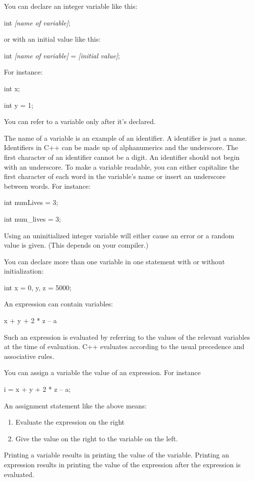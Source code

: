 \documentclass[
]{article}
\providecommand{\tightlist}{%
  \setlength{\itemsep}{0pt}\setlength{\parskip}{0pt}}
\begin{document}
You can declare an integer variable like this:

int\emph{ {[}name of variable{]}};

or with an initial value like this:

int\emph{ {[}name of variable{]}} = \emph{{[}initial value{]}};

For instance:

int x;

int y = 1;

You can refer to a variable only after it's declared.

The name of a variable is an example of an identifier. A identifier is
just a name. Identifiers in C++ can be made up of alphanumerics and the
underscore. The first character of an identifier cannot be a digit. An
identifier should not begin with an underscore. To make a variable
readable, you can either capitalize the first character of each word in
the variable's name or insert an underscore between words. For instance:

int numLives = 3;

int num\_lives = 3;

Using an uninitialized integer variable will either cause an error or a
random value is given. (This depends on your compiler.)

You can declare more than one variable in one statement with or without
initialization:

int x = 0, y, z = 5000;

An expression can contain variables:

x + y + 2 * z -- a

Such an expression is evaluated by referring to the values of the
relevant variables at the time of evaluation. C++ evaluates according to
the usual precedence and associative rules.

You can assign a variable the value of an expression. For instance

i = x + y + 2 * z -- a;

An assignment statement like the above means:

\begin{enumerate}
\def\labelenumi{\arabic{enumi}.}
\tightlist
\item
  Evaluate the expression on the right
\item
  Give the value on the right to the variable on the left.
\end{enumerate}

Printing a variable results in printing the value of the variable.
Printing an expression results in printing the value of the expression
after the expression is evaluated.
\end{document}
